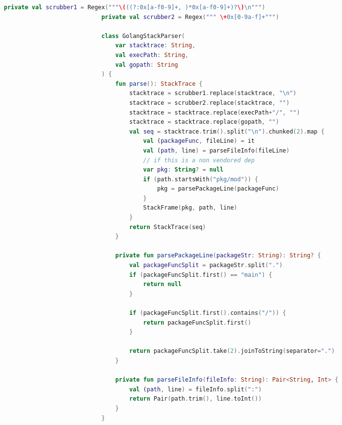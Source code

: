 \documentclass[12pt,pdftex,titlepage]{report}
\begin{document}
                    \begin{spacing}{1.0}
                        \begin{lstlisting}[language=Kotlin, gobble=28, label={lst:goparser}]
                            private val scrubber1 = Regex("""\(((?:0x[a-f0-9]+, )*0x[a-f0-9]+)?\)\n""")
                            private val scrubber2 = Regex(""" \+0x[0-9a-f]+""")
                            
                            class GolangStackParser(
                                var stacktrace: String, 
                                val execPath: String, 
                                val gopath: String
                            ) {
                                fun parse(): StackTrace {
                                    stacktrace = scrubber1.replace(stacktrace, "\n")
                                    stacktrace = scrubber2.replace(stacktrace, "")
                                    stacktrace = stacktrace.replace(execPath+"/", "")
                                    stacktrace = stacktrace.replace(gopath, "")
                                    val seq = stacktrace.trim().split("\n").chunked(2).map {
                                        val (packageFunc, fileLine) = it
                                        val (path, line) = parseFileInfo(fileLine) 
                                        // if this is a non vendored dep
                                        var pkg: String? = null
                                        if (path.startsWith("pkg/mod")) {
                                            pkg = parsePackageLine(packageFunc)
                                        }
                                        StackFrame(pkg, path, line)
                                    }
                                    return StackTrace(seq)
                                }
                            
                                private fun parsePackageLine(packageStr: String): String? {
                                    val packageFuncSplit = packageStr.split(".")
                                    if (packageFuncSplit.first() == "main") {
                                        return null
                                    }
                            
                                    if (packageFuncSplit.first().contains("/")) {
                                        return packageFuncSplit.first()
                                    }
                            
                                    return packageFuncSplit.take(2).joinToString(separator=".")
                                }
                            
                                private fun parseFileInfo(fileInfo: String): Pair<String, Int> {
                                    val (path, line) = fileInfo.split(":")
                                    return Pair(path.trim(), line.toInt())
                                }
                            }
                        \end{lstlisting}
                    \end{spacing}
\end{document}
